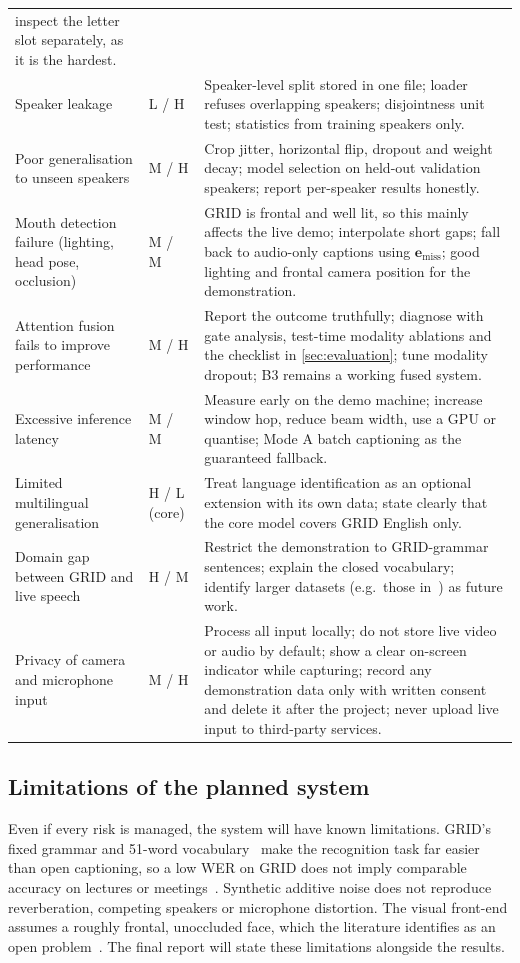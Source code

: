 {\begin{longtable}{@{}p{3.5cm}p{1.4cm}p{10.2cm}@{}}
inspect the letter slot separately, as it is the hardest. \\
Speaker leakage & L / H &
Speaker-level split stored in one file; loader refuses overlapping speakers;
disjointness unit test; statistics from training speakers only. \\
Poor generalisation to unseen speakers & M / H &
Crop jitter, horizontal flip, dropout and weight decay; model selection on
held-out validation speakers; report per-speaker results honestly. \\
Mouth detection failure (lighting, head pose, occlusion) & M / M &
GRID is frontal and well lit, so this mainly affects the live demo; interpolate
short gaps; fall back to audio-only captions using $\mathbf{e}_{\text{miss}}$; good
lighting and frontal camera position for the demonstration. \\
Attention fusion fails to improve performance & M / H &
Report the outcome truthfully; diagnose with gate analysis, test-time modality
ablations and the checklist in \cref{sec:evaluation}; tune modality dropout;
B3 remains a working fused system. \\
Excessive inference latency & M / M &
Measure early on the demo machine; increase window hop, reduce beam width, use a
GPU or quantise; Mode A batch captioning as the guaranteed fallback. \\
Limited multilingual generalisation & H / L (core) &
Treat language identification as an optional extension with its own data; state
clearly that the core model covers GRID English only. \\
Domain gap between GRID and live speech & H / M &
Restrict the demonstration to GRID-grammar sentences; explain the closed
vocabulary; identify larger datasets (e.g.\ those in~\cite{afouras2022}) as future
work. \\
Privacy of camera and microphone input & M / H &
Process all input locally; do not store live video or audio by default; show a
clear on-screen indicator while capturing; record any demonstration data only
with written consent and delete it after the project; never upload live input to
third-party services. \\
\end{longtable}
}

\subsection{Limitations of the planned system}
Even if every risk is managed, the system will have known limitations. GRID's
fixed grammar and 51-word vocabulary~\cite{cooke2006} make the recognition task far
easier than open captioning, so a low WER on GRID does not imply comparable
accuracy on lectures or meetings~\cite{afouras2022}. Synthetic additive noise does
not reproduce reverberation, competing speakers or microphone distortion. The
visual front-end assumes a roughly frontal, unoccluded face, which the literature
identifies as an open problem~\cite{ameer2025,kanavnet2026}. The final report will
state these limitations alongside the results.
